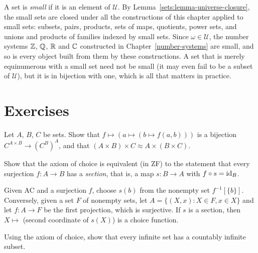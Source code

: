 \begin{remark}\label{sets:remark-small-sets}
A set is \emph{small} if it is an element of $\mathcal{U}$. By
Lemma~\ref{sets:lemma-universe-closure}, the small sets are closed under all
the constructions of this chapter applied to small sets: subsets, pairs,
products, sets of maps, quotients, power sets, and unions and products of
families indexed by small sets. Since $\omega \in \mathcal{U}$, the number
systems $\mathbb{Z}$, $\mathbb{Q}$, $\mathbb{R}$ and $\mathbb{C}$ constructed in
Chapter~\ref{number-systems} are small, and so is every object built from them
by these constructions. A set that is merely equinumerous with a small set
need not be small (it may even fail to be a subset of $\mathcal{U}$), but it is
in bijection with one, which is all that matters in practice.
\end{remark}

\section{Exercises}\label{sets:section-exercises}

\begin{exercise}\label{sets:exercise-currying}
Let $A$, $B$, $C$ be sets. Show that $f \mapsto (a \mapsto (b \mapsto f(a, b)))$ is a
bijection $C^{A \times B} \to (C^B)^A$, and that $(A \times B) \times C \approx A \times (B \times C)$.
\end{exercise}

\begin{exercise}\label{sets:exercise-sections}
Show that the axiom of choice is equivalent (in ZF) to the statement that every
surjection $f \colon A \to B$ has a \emph{section}, that is, a map
$s \colon B \to A$ with $f \circ s = \mathrm{id}_B$.
\end{exercise}

\begin{solution}
Given AC and a surjection $f$, choose $s(b)$ from the nonempty set $f^{-1}[\{b\}]$.
Conversely, given a set $F$ of nonempty sets, let
$A = \{(X, x) : X \in F, x \in X\}$ and let $f \colon A \to F$ be the first
projection, which is surjective. If $s$ is a section, then
$X \mapsto$ (second coordinate of $s(X)$) is a choice function.
\end{solution}

\begin{exercise}\label{sets:exercise-countable-subset}
Using the axiom of choice, show that every infinite set has a countably
infinite subset.
\end{exercise}

